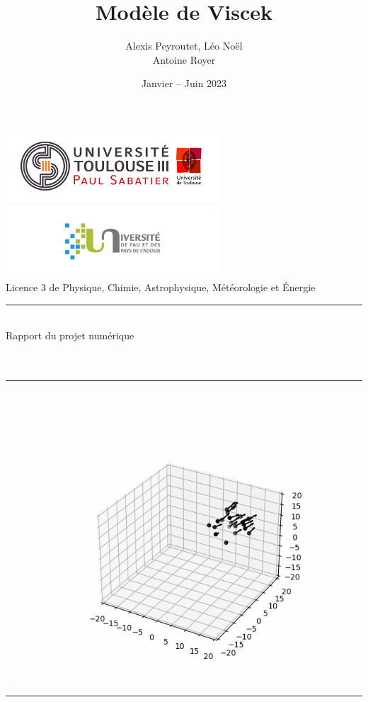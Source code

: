 \documentclass[french, a4paper, 12pt, openany]{report}
\title{\sc Modèle de Viscek}
\author{Alexis Peyroutet, Léo Noël\\Antoine Royer}
\date{Janvier – Juin 2023}
\begin{document}
\makeatletter
\begin{titlepage}
	\centering
	
	\includegraphics[width=8cm]{images/ut3.png} \hfill \includegraphics[width=8cm]{images/uppa.png} \\
	{\large{\sc Licence 3 de Physique, Chimie, Astrophysique, Météorologie et Énergie}} \\
	\rule{0.5\linewidth}{0.4pt} \\
	{\sc Rapport du projet numérique} \\
	
	
	\vfill
	{\huge {\sc \@title}} \\ \vspace{1cm}
	{\Large \@author} \\
	\rule{0.25\linewidth}{0.4pt} \\ \vspace{0.25cm}
	{\Large \@date}
	
	\vfill 
	\includegraphics[width=0.7\linewidth]{images/page_garde2.png}
	\vfill 
	\rule{\linewidth}{0.4pt}
\end{titlepage}
\makeatother

\tableofcontents

\end{document}
